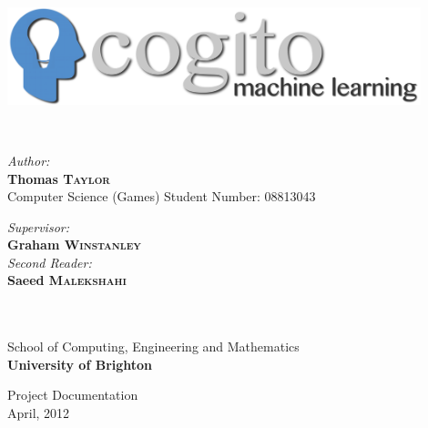 \documentclass[a4paper,oneside]{report}
\begin{document}
%
%
\begin{titlepage}
\begin{center}

\includegraphics[width=120mm]{sources/images/cogito_logo_main.png}

\HRuleLight\\[0.5cm]

\begin{minipage}{0.45\textwidth}
	\begin{flushleft}\large
		\emph{Author:}\\
			\textbf{Thomas \textsc{Taylor}}\\[0.27cm]
			Computer Science (Games)
			Student Number: 08813043
	\end{flushleft}
\end{minipage}
\begin{minipage}{0.43\textwidth}
	\begin{flushright} \large
		\emph{Supervisor:} \\
		\textbf{Graham \textsc{Winstanley}}\\[0.25cm]
		\emph{Second Reader:}\\
		\textbf{Saeed \textsc{Malekshahi}}
	\end{flushright}
\end{minipage}\\[0.75cm] 

\HRuleLight\\[0.2cm]

\large School of Computing, Engineering and Mathematics\\ \textbf{University of Brighton}

\vfill
\huge Project Documentation\\
\large April, 2012\\

\end{center}
\end{titlepage}

%
%
{
	\renewcommand\thepage{}
	\setcounter{tocdepth}{3}
	\tableofcontents
	\clearpage
}

\setcounter{page}{1}

%
%
\end{document}
